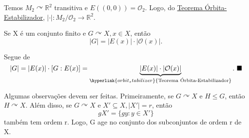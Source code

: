 \documentclass[algebra_notes.tex]{subfiles}
\begin{document}
\begin{example*}
	Temos \(M_{2} \curvearrowright \mathbb{R}^{2}\) transitiva e \(E((0, 0)) = \mathcal{O}_{2}\). Logo, do \hyperlink{orbit_stabilizer}{Teorema Órbita-Estabilizador},
	\(|\cdot |:M_{2}/\mathcal{O}_{2}\rightarrow \mathbb{R}^{2}\).
\end{example*}
\begin{crl*}
	Se X é um conjunto finito e \(G \curvearrowright X, x\in X\), então
	\[
		|G| = |E(x)|\cdot |\mathcal{O}(x)|.
	\]
\end{crl*}
\begin{proof*}
	Segue de
	\[
		|G| = |E(x)|\cdot [G:E(x)] = \underbrace{|E(x)|\cdot |\mathcal{O}(x)|}_{\hyperlink{orbit_stabilizer}{\text{Teorema Órbita-Estabilizador}}}.\text{ \qedsymbol}
	\]
\end{proof*}
Algumas observações devem ser feitas. Primeiramente, se \(G \curvearrowright X\) e \(H\leq G\), então \(H \curvearrowright X\).
Além disso, se \(G \curvearrowright X\) e \(X'\subseteq{X}, |X'| = r\), então
\[
	gX' = \{gy: y\in X'\}
\]
também tem ordem r. Logo, G age no conjunto dos subconjuntos de ordem r de X.
\end{document}

